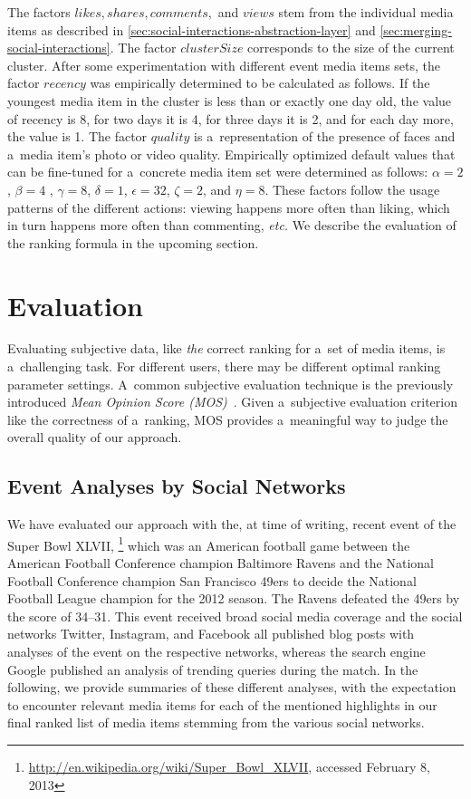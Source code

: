 The factors $ \mathit{likes}, \mathit{shares}, \mathit{comments},$ and $ \mathit{views} $
stem from the individual media items as described in \autoref{sec:social-interactions-abstraction-layer}
and \autoref{sec:merging-social-interactions}.
The factor $ \mathit{clusterSize} $ corresponds to the size of the current cluster. 
After some experimentation with different event media items sets,
the factor $ \mathit{recency} $ was empirically determined to be calculated as follows.
If the youngest media item in the cluster is less than or exactly one day old,
the value of recency is 8, for two days it is 4, for three days it is 2,
and for each day more, the value is 1.
The factor $ \mathit{quality} $ is a~representation of the
presence of faces and a~media item's photo or video quality.
Empirically optimized default values
that can be fine-tuned for a~concrete media item set
were determined as follows:
$ \alpha = 2 $, $ \beta = 4 $ , $ \gamma = 8 $, $ \delta = 1 $,
$ \epsilon = 32 $, $ \zeta = 2 $, and $ \eta = 8 $.
These factors follow the usage patterns of the different actions:
viewing happens more often than liking, which in turn happens more often than commenting, \emph{etc.}
We describe the evaluation of the ranking formula in the upcoming section.

\section{Evaluation}
\label{sec-chapter7-evaluation}

Evaluating subjective data, like \emph{the} correct ranking
for a~set of media items, is a~challenging task.
For different users, there may be different optimal ranking parameter settings.
A~common subjective evaluation technique
is the previously introduced \emph{Mean Opinion Score (MOS)}~\cite{itu1998mos}.
Given a~subjective evaluation criterion
like the correctness of a~ranking,
MOS provides a~meaningful way to judge the overall quality of our approach.

\subsection{Event Analyses by Social Networks}

We have evaluated our approach with the, at time of writing,
recent event of the Super Bowl XLVII,%
\footnote{\url{http://en.wikipedia.org/wiki/Super_Bowl_XLVII},
accessed February 8, 2013}
which was an American football game between
the American Football Conference champion Baltimore Ravens
and the National Football Conference champion
San Francisco 49ers to decide the National Football League
champion for the 2012 season.
The Ravens defeated the 49ers by the score of 34--31.
This event received broad social media coverage
and the social networks
Twitter, Instagram, and Facebook all published blog posts
with analyses of the event on the respective networks,
whereas the search engine Google
published an analysis of trending queries during the match.
In the following, we provide summaries of these different analyses,
with the expectation to encounter relevant media items
for each of the mentioned highlights in our final ranked list of media items
stemming from the various social networks.

